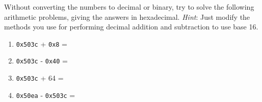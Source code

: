 \documentclass[12pt]{article}
\newenvironment{ex}[2][Exercise]{\begin{trivlist}
		\item[\hskip \labelsep {\bfseries #1}\hskip \labelsep {\bfseries #2.}]}{\end{trivlist}}
\begin{document}
\begin{ex}{2.4}
	Without converting the numbers to decimal or binary, try to solve the following
	arithmetic problems, giving the answers in hexadecimal. \emph{Hint}: Just
	modify the methods you use for performing decimal addition and subtraction
	to use base 16.
	\begin{enumerate}[label=(\alph*)]
		\item \texttt{0x503c} + \texttt{0x8} = \makebox[1cm]{\hrulefill}
		\item \texttt{0x503c} - \texttt{0x40} = \makebox[1cm]{\hrulefill}
		\item \texttt{0x503c} + 64 = \makebox[1cm]{\hrulefill} 
		\item \texttt{0x50ea} - \texttt{0x503c} = \makebox[1cm]{\hrulefill} 
	\end{enumerate}
\end{ex}
\end{document}

